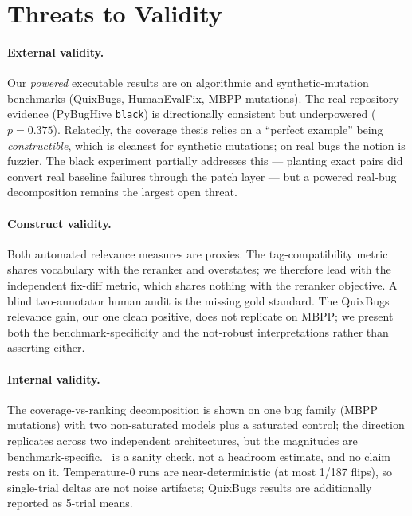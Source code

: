 \section{Threats to Validity}
\label{sec:threats}

\paragraph{External validity.} Our \emph{powered} executable results are on
algorithmic and synthetic-mutation benchmarks (QuixBugs, HumanEvalFix, MBPP
mutations). The real-repository evidence (PyBugHive \texttt{black}) is
directionally consistent but underpowered ($p{=}0.375$).
Relatedly, the coverage thesis relies on a ``perfect example'' being
\emph{constructible}, which is cleanest for synthetic mutations; on real bugs
the notion is fuzzier. The black experiment partially addresses this ---
planting exact pairs did convert real baseline failures through the patch
layer --- but a powered real-bug decomposition remains the largest open
threat.

\paragraph{Construct validity.} Both automated relevance measures are
proxies. The tag-compatibility metric shares vocabulary with the reranker and
overstates; we therefore lead with the independent fix-diff metric, which
shares nothing with the reranker objective. A blind two-annotator human audit
is the missing gold standard.
The QuixBugs relevance gain, our one clean positive, does not replicate on
MBPP; we present both the benchmark-specificity and the not-robust
interpretations rather than asserting either.

\paragraph{Internal validity.} The coverage-vs-ranking decomposition is
shown on one bug family (MBPP mutations) with two non-saturated models plus a
saturated control; the direction replicates across two independent
architectures, but the magnitudes are benchmark-specific. \oracleself\ is a
sanity check, not a headroom estimate, and no claim rests on it. Temperature-0
runs are near-deterministic (at most 1/187 flips), so single-trial deltas are
not noise artifacts; QuixBugs results are additionally reported as 5-trial
means.

